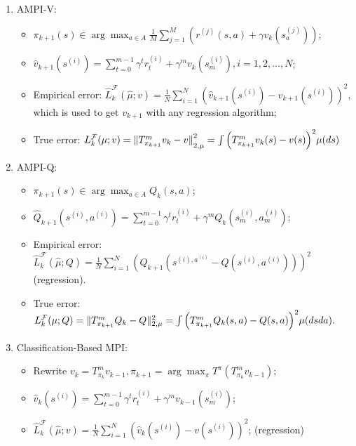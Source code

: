 \documentclass[a4paper]{article}
\begin{document}
\begin{enumerate}
    \item {AMPI-V}: 
        \begin{itemize}
            \item $ \pi_{k+1}(s) \in \arg\max_{a \in A} \frac{1}{M} \sum^{M}_{j=1} (r^{(j)}(s,a) + \gamma v_k(s^{(j)}_a)) $;
            \item $ \hat v_{k+1}(s^{(i)}) = \sum^{m-1}_{t=0} \gamma^t r^{(i)}_t + \gamma^m v_k(s^{(i)}_m), i = 1, 2, \ldots, N $;
            \item Empirical error: $ \hat L^{\mathcal{F}}_k(\hat \mu; v) = \frac{1}{N} \sum^{N}_{i=1} {(\hat v_{k+1}(s^{(i)}) - v_{k+1}(s^{(i)}))}^2 $, which is used to get $ v_{k+1} $ with any regression algorithm;
            \item True error: $ L^{\mathcal{F}}_k(\mu;v) = {\Arrowvert T_{\pi_{k+1}}^{m}v_k - v \Arrowvert}_{2,\mu}^2 = \int {\left( T_{\pi_{k+1}}^{m}v_k(s) - v(s) \right)}^2 \mu(ds)$
        \end{itemize} 
    \item {AMPI-Q}:
        \begin{itemize}
            \item $ \pi_{k+1}(s) \in \arg\max_{a \in A} Q_{k}(s,a) $;
            \item $ \hat Q_{k+1}(s^{(i)}, a^{(i)}) = \sum^{m-1}_{t=0} \gamma^t r^{(i)}_t + \gamma^{m} Q_k(s^{(i)}_m, a^{(i)}_m)$;
            \item Empirical error: $ \hat L^{\mathcal{F}}_{k}(\hat \mu; Q) = \frac{1}{N} \sum^{N}_{i=1} {\left( \hat Q_{k+1}(s^{(i), a^{(i)}} - Q(s^{(i)}, a^{(i)})) \right)}^{2} $ (regression).
            \item True error: $ L^{\mathcal{F}}_{k}(\mu; Q)= \Arrowvert T^m_{\pi_{k+1}}Q_k - Q \Arrowvert^2_{2,\mu} = \int {\left( T^{m}_{\pi_{k+1}}Q_k (s,a) - Q(s,a) \right)}^2 \mu(dsda). $
        \end{itemize}
    \item {Classification-Based MPI}:
        \begin{itemize}
            \item Rewrite $ v_k = T^m_{\pi_k} v_{k-1}, \pi_{k+1} = \arg\max_{\pi} T^{\pi}(T^{m}_{\pi_k} v_{k-1}) $;
            \item $ \hat v_k(s^{(i)}) = \sum^{m-1}_{t=0} \gamma^t r^{(i)}_t + \gamma^m v_{k-1} (s^{(i)}_m) $;
            \item $ \hat L^{\mathcal{F}}_{k}(\hat \mu; v) = \frac{1}{N} \sum^{N}_{i=1} {\left( \hat v_k(s^{(i)}) - v(s^{(i)}) \right)}^2 $; (regression)

\end{itemize}
\end{enumerate}
\end{document}
